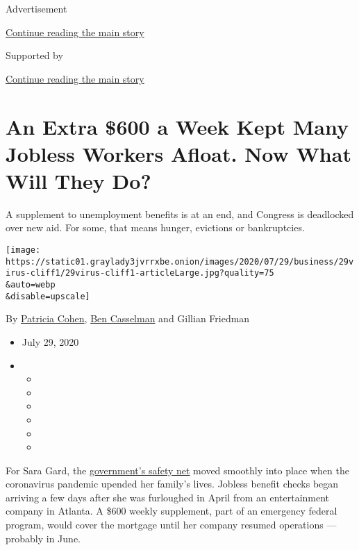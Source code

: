 Advertisement

\protect\hyperlink{after-top}{Continue reading the main story}

Supported by

\protect\hyperlink{after-sponsor}{Continue reading the main story}

\hypertarget{an-extra-600-a-week-kept-many-jobless-workers-afloat-now-what-will-they-do}{%
\section{An Extra \$600 a Week Kept Many Jobless Workers Afloat. Now
What Will They
Do?}\label{an-extra-600-a-week-kept-many-jobless-workers-afloat-now-what-will-they-do}}

A supplement to unemployment benefits is at an end, and Congress is
deadlocked over new aid. For some, that means hunger, evictions or
bankruptcies.

\texttt{[image: https://static01.graylady3jvrrxbe.onion/images/2020/07/29/business/29virus-cliff1/29virus-cliff1-articleLarge.jpg?quality=75\\\&auto=webp\\\&disable=upscale]}

By \href{https://www.nytimes3xbfgragh.onion/by/patricia-cohen}{Patricia
Cohen}, \href{https://www.nytimes3xbfgragh.onion/by/ben-casselman}{Ben
Casselman} and Gillian Friedman

\begin{itemize}
\item
  July 29, 2020
\item
  \begin{itemize}
  \item
  \item
  \item
  \item
  \item
  \item
  \end{itemize}
\end{itemize}

For Sara Gard, the
\href{https://www.nytimes3xbfgragh.onion/article/coronavirus-stimulus-package-questions-answers.html}{government's
safety net} moved smoothly into place when the coronavirus pandemic
upended her family's lives. Jobless benefit checks began arriving a few
days after she was furloughed in April from an entertainment company in
Atlanta. A \$600 weekly supplement, part of an emergency federal
program, would cover the mortgage until her company resumed operations
--- probably in June.

